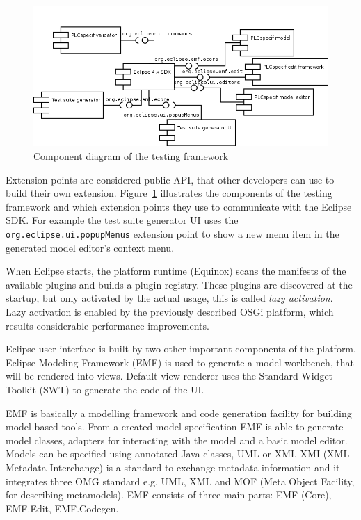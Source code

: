 \begin{figure}[htp]
\centering
\includegraphics[scale=0.5]{figures/design_components.png}
\caption{Component diagram of the testing framework}
\label{fig:designcomponents}
\end{figure}

Extension points are considered public API, that other developers can use to build their own extension. Figure~\ref{fig:designcomponents} illustrates the components of the testing framework and which extension points they use to communicate with the Eclipse SDK. For example the test suite generator UI uses the \texttt{org.eclipse.ui.popupMenus} extension point to show a new menu item in the generated model editor's context menu.

When Eclipse starts, the platform runtime (Equinox) scans the manifests of the available plugins and builds a plugin registry. These plugins are discovered at the startup, but only activated by the actual usage, this is called \textit{lazy activation}. Lazy activation is enabled by the previously described OSGi platform, which results considerable performance improvements.

Eclipse user interface is built by two other important components of the platform. Eclipse Modeling Framework (EMF) is used to generate a model workbench, that will be rendered into views. Default view renderer uses the Standard Widget Toolkit (SWT) to generate the code of the UI.

EMF is basically a modelling framework and code generation facility for building model based tools. From a created model specification EMF is able to generate model classes, adapters for interacting with the model and a basic model editor.  Models can be specified using annotated Java classes, UML or XMI. XMI (XML Metadata Interchange) is a standard to exchange metadata information and it integrates three OMG standard e.g. UML, XML and MOF (Meta Object Facility, for describing metamodels). EMF consists of three main parts: EMF (Core), EMF.Edit, EMF.Codegen.

